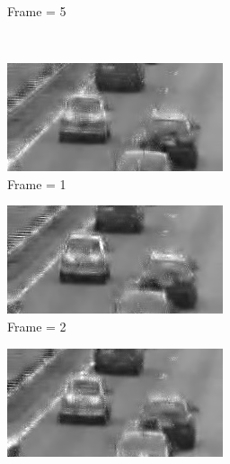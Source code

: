 \documentclass[a4paper, landscape]{article}
\begin{document}
\begin{figure}[H]
\begin{subfigure}{0.13\linewidth}
		\caption{Frame = 5}
	\end{subfigure}\\
	\begin{subfigure}{0.13\linewidth}
		\centering
		\includegraphics[width=\linewidth]{cars/reconstructed, T = 7, frame = 1.png}
		\caption{Frame = 1}
	\end{subfigure}
	\begin{subfigure}{0.13\linewidth}
		\centering
		\includegraphics[width=\linewidth]{cars/reconstructed, T = 7, frame = 2.png}
		\caption{Frame = 2}
	\end{subfigure}
	\begin{subfigure}{0.13\linewidth}
		\centering
		\includegraphics[width=\linewidth]{cars/reconstructed, T = 7, frame = 3.png}

\end{subfigure}
\end{figure}
\end{document}
